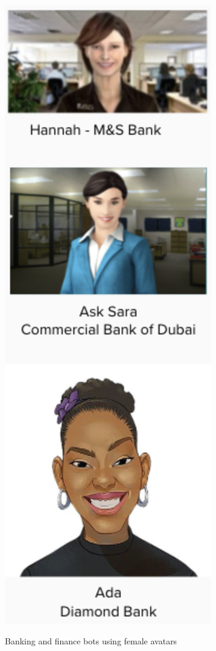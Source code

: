\documentclass{sigchi-ext}
\begin{document}
\begin{marginfigure}[3pc]
  \begin{minipage}{\marginparwidth}
    \centering
    \includegraphics[width=0.8\marginparwidth]{figures/avatars.png}
    \caption{Banking and finance bots using female avatars}
    \label{fig:female-avatars}
  \end{minipage}
\end{marginfigure}
\end{document}
